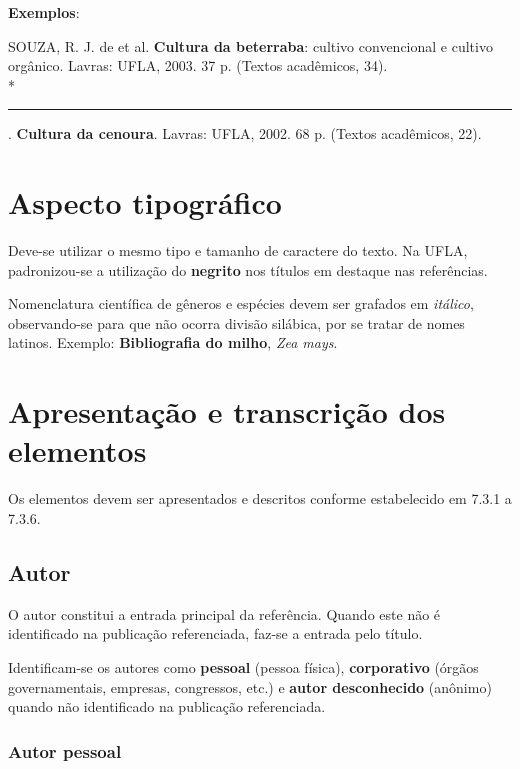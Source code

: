 \begin{exemplomanual}
\textbf{Exemplos}:\\
\begin{singlespace}
SOUZA, R. J. de et al. \textbf{Cultura da beterraba}: cultivo convencional e cultivo orgânico. Lavras: UFLA, 2003. 37 p. (Textos acadêmicos, 34).\\*

\rule{1cm}{0.4pt}. \textbf{Cultura da cenoura}. Lavras: UFLA, 2002. 68 p. (Textos acadêmicos, 22).
\end{singlespace}
\end{exemplomanual}


\section{Aspecto tipográfico}

Deve-se utilizar o mesmo tipo e tamanho de caractere do texto. Na UFLA, padronizou-se a utilização do \textbf{negrito} nos títulos em destaque nas referências.

Nomenclatura científica de gêneros e espécies devem ser grafados em \textit{itálico}, observando-se para que não ocorra divisão silábica, por se tratar de nomes latinos.  Exemplo: \textbf{Bibliografia do milho}, \textit{Zea mays}.


\section{Apresentação e transcrição dos elementos}

Os elementos devem ser apresentados e descritos conforme estabelecido em 7.3.1 a 7.3.6.


\subsection{Autor}

O autor constitui a entrada principal da referência. Quando este não é identificado na publicação referenciada, faz-se a entrada pelo título.

Identificam-se os autores como \textbf{pessoal} (pessoa física), \textbf{corporativo} (órgãos governamentais, empresas, congressos, etc.) e \textbf{autor desconhecido} (anônimo) quando não identificado na publicação referenciada.


\subsubsection{Autor pessoal}

